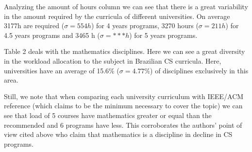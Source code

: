 \documentclass[conference]{IEEEtran}
\begin{document}
	Analyzing the amount of hours column we can see that there is a great variability in the amount required by the curricula of different universities. On average 3177h are required ($ \sigma = 554h $) for 4 years programs, 3270 hours ($ \sigma = 211h $) for 4.5 years programs and 3465 h ($ \sigma = ***h $) for 5 years programs.

	Table 2 deals with the mathematics disciplines. Here we can see a great diversity in the workload allocation to the subject in Brazilian CS curricula. Here, universities have an average of 15.6\% ($ \sigma = 4.77\% $) of disciplines exclusively in this area.

	Still, we note that when comparing each university curriculum with IEEE/ACM reference (which claims to be the minimum necessary to cover the topic) we can see that load of 5 courses have mathematics greater or equal than the recommended and 6 programs have less. This corroborates the authors' point of view cited above who claim that mathematics is a discipline in decline in CS programs.
\end{document}
